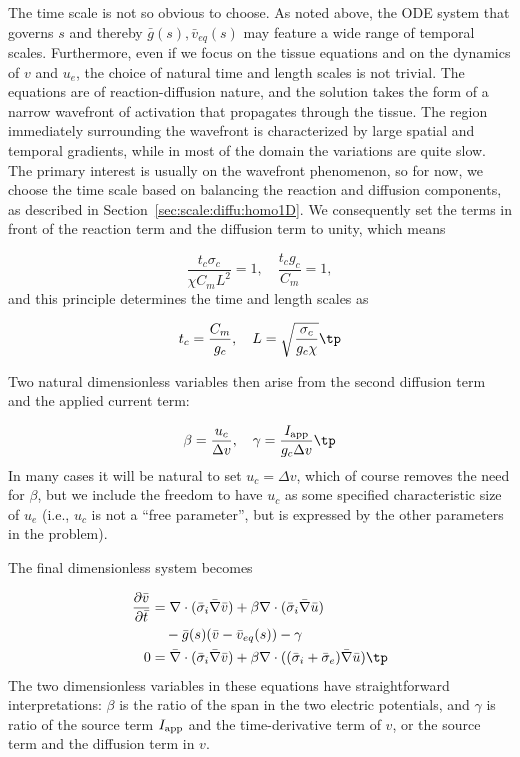 \documentclass[graybox,envcountchap,sectrefs,final]{svmonodo}
\begin{document}
The time scale is not so obvious to choose. As noted above, the ODE
system that governs $s$ and thereby $\bar g(s), \bar v_{eq} (s)$ may
feature a wide range of temporal scales. Furthermore, even if we focus
on the tissue equations and on the dynamics of $v$ and $u_e$, the
choice of natural time and length scales is not trivial.
The equations are of reaction-diffusion nature, and the
solution takes the form of a narrow wavefront of activation that
propagates through the tissue. The region immediately surrounding
the wavefront is characterized by large spatial and temporal
gradients, while in most of the
domain the variations are quite slow. The primary interest is
usually on the wavefront phenomenon, so
for now, we choose the time scale
based on balancing the reaction and diffusion components, as described
in Section~\ref{sec:scale:diffu:homo1D}.  We consequently
set the terms in front of the reaction term and the diffusion term to
unity, which means

\[ \frac{t_c\sigma_c}{\chi C_mL^2} = 1,\quad \frac{t_cg_c}{C_m} =1,\]
and this principle determines the time and length scales as

\[ t_c = \frac{C_m}{g_c},\quad L = \sqrt{\frac{\sigma_c}{g_c \chi}}\tp\]

Two natural dimensionless variables then arise from the second diffusion
term and the applied current term:

\[ \beta = \frac{u_c}{\Delta v}, \quad \gamma =
\frac{I_{\rm{app}}}{g_c \Delta v} \tp\]
In many cases it will be natural to set $u_c=\Delta v$, which of
course removes the need for $\beta$, but we
include the freedom to have $u_c$ as
some specified characteristic size of $u_e$ (i.e., $u_c$ is not a
``free parameter'', but is expressed by the other parameters in the
problem).

The final dimensionless system becomes

\begin{align}
\frac{\partial \bar v}{\partial \bar t} &=
\nabla\cdot( \bar \sigma_i\bar\nabla\bar v) +
\beta\nabla\cdot (\bar \sigma_i\bar \nabla \bar u) \\ 
& \quad -\bar g (s)(\bar v-\bar v_{eq}(s))
- \gamma\\ 
0 &= \bar \nabla\cdot( \bar \sigma_i\bar \nabla \bar v) +
\beta\nabla\cdot ((\bar \sigma_i + \bar \sigma_e)\bar \nabla \bar u) \tp
\end{align}
The two dimensionless variables in these equations have
straightforward
interpretations: $\beta$ is the ratio of the span in the two electric
potentials, and $\gamma$ is ratio of the source term $I_{\rm{app}}$ and the
time-derivative term of $v$, or the source term and the diffusion term
in $v$.
\end{document}
